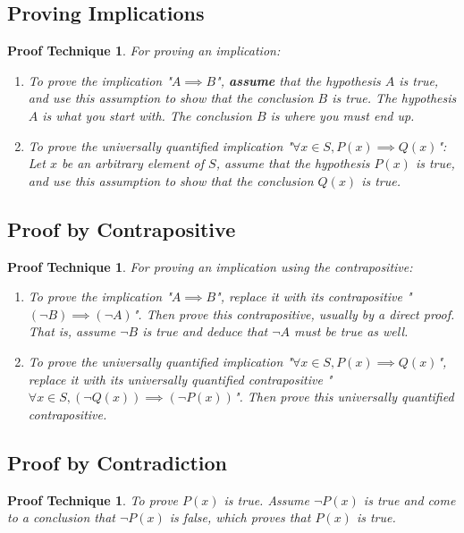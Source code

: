 \documentclass[10pt]{article}
\theoremstyle{break}
\newtheorem{pt}[thm]{Proof Technique}
\begin{document}
\subsection{Proving Implications}
\begin{pt}
    For proving an implication: 
    \begin{enumerate}
    \item To prove the implication "$A \implies B$", \textbf{assume} that the hypothesis 
    $A$ is true, and use this assumption to show that the conclusion $B$ is true. The 
    hypothesis $A$ is what you start with. The conclusion $B$ is where you must end up.
    \item To prove the universally quantified implication "$\forall x \in S, P(x) \implies Q(x)$":\\
    Let $x$ be an arbitrary element of $S$, assume that the hypothesis $P(x)$ is true, and 
    use this assumption to show that the conclusion $Q(x)$ is true.
\end{enumerate}
\end{pt}

\subsection{Proof by Contrapositive}
\begin{pt}
    For proving an implication using the contrapositive:
\begin{enumerate}
    \item To prove the implication "$A \implies B$", replace it with its contrapositive
    "$(\neg B) \implies (\neg A)$". Then prove this contrapositive, usually by a direct 
    proof. That is, assume $\neg B$ is true and deduce that $\neg A$ must be true as well.
    \item To prove the universally quantified implication 
    "$\forall x \in S, P(x) \implies Q(x)$", replace it with its universally quantified contrapositive
    "$\forall x \in S, (\neg Q(x)) \implies (\neg P(x))$". Then prove this universally quantified contrapositive.
\end{enumerate}
\end{pt}

\subsection{Proof by Contradiction}
\begin{pt}
To prove $P(x)$ is true. Assume $\neg P(x)$ is true and come to a conclusion that $\neg P(x)$ is false, which proves that $P(x)$ is true.
\end{pt}
    
\end{document}
